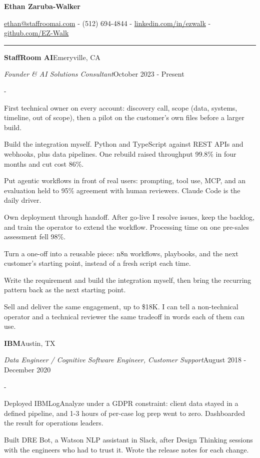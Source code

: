\documentclass[10pt,letterpaper]{article}
\newenvironment{cvitems}{%
  \begin{list}{-}{%
    \setlength{\leftmargin}{12pt}%
    \setlength{\itemsep}{1.2pt}%
    \setlength{\parsep}{0pt}%
    \setlength{\topsep}{1.5pt}%
    \setlength{\partopsep}{0pt}%
    \setlength{\labelwidth}{6pt}%
    \setlength{\labelsep}{6pt}%
    \setlength{\itemindent}{0pt}%
  }%
}{\end{list}}
\newcommand{\cvsection}[1]{%
  \vspace{7pt}%
  \noindent{\bfseries\fontsize{11pt}{13pt}\selectfont\MakeUppercase{#1}}\par
  \vspace{1pt}%
  \noindent\rule{\textwidth}{0.4pt}\par
  \vspace{4pt}%
}
\newcommand{\cventryhead}[4]{%
  \noindent\textbf{#1}\hfill#2\par
  \vspace{0.5pt}%
  \noindent\textit{#3}\hfill#4\par
}
\begin{document}
\begin{center}
  {\bfseries\fontsize{22pt}{24pt}\selectfont Ethan Zaruba-Walker\par}
  \vspace{4pt}
  {\fontsize{10pt}{12pt}\selectfont
    \href{mailto:ethan@staffroomai.com}{ethan@staffroomai.com}
    {-}
    (512) 694-4844
    {-}
    \href{https://linkedin.com/in/ezwalk}{linkedin.com/in/ezwalk}
    {-}
    \href{https://github.com/EZ-Walk}{github.com/EZ-Walk}\par}
\end{center}
\vspace{2pt}

\cvsection{Experience}

\cventryhead{StaffRoom AI}{Emeryville, CA}
{Founder \& AI Solutions Consultant}{October 2023 - Present}
\begin{cvitems}
  \item First technical owner on every account: discovery call, scope (data, systems, timeline, out of scope), then a pilot on the customer's own files before a larger build.
  \item Build the integration myself. Python and TypeScript against REST APIs and webhooks, plus data pipelines. One rebuild raised throughput 99.8\% in four months and cut cost 86\%.
  \item Put agentic workflows in front of real users: prompting, tool use, MCP, and an evaluation held to 95\% agreement with human reviewers. Claude Code is the daily driver.
  \item Own deployment through handoff. After go-live I resolve issues, keep the backlog, and train the operator to extend the workflow. Processing time on one pre-sales assessment fell 98\%.
  \item Turn a one-off into a reusable piece: n8n workflows, playbooks, and the next customer's starting point, instead of a fresh script each time.
  \item Write the requirement and build the integration myself, then bring the recurring pattern back as the next starting point.
  \item Sell and deliver the same engagement, up to \$18K. I can tell a non-technical operator and a technical reviewer the same tradeoff in words each of them can use.
\end{cvitems}

\vspace{3pt}
\cventryhead{IBM}{Austin, TX}
{Data Engineer / Cognitive Software Engineer, Customer Support}{August 2018 - December 2020}
\begin{cvitems}
  \item Deployed IBMLogAnalyze under a GDPR constraint: client data stayed in a defined pipeline, and 1-3 hours of per-case log prep went to zero. Dashboarded the result for operations leaders.
  \item Built DRE Bot, a Watson NLP assistant in Slack, after Design Thinking sessions with the engineers who had to trust it. Wrote the release notes for each change.
\end{cvitems}
\end{document}

